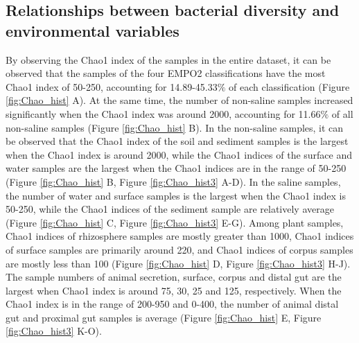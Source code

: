 \documentclass[11pt, a4paper]{article}
\begin{document}
\begin{spacing}{1.5}
\subsection{Relationships between bacterial diversity and environmental variables}

By observing the Chao1 index of the samples in the entire dataset, it can be observed that the samples of the four EMPO2 classifications have the most Chao1 index of 50-250, accounting for 14.89-45.33$\%$ of each classification (Figure \ref{fig:Chao_hist} A). At the same time, the number of non-saline samples increased significantly when the Chao1 index was around 2000, accounting for 11.66$\%$ of all non-saline samples (Figure \ref{fig:Chao_hist} B). In the non-saline samples, it can be observed that the Chao1 index of the soil and sediment samples is the largest when the Chao1 index is around 2000, while the Chao1 indices of the surface and water samples are the largest when the Chao1 indices are in the range of 50-250 (Figure \ref{fig:Chao_hist} B, Figure \ref{fig:Chao_hist3} A-D). In the saline samples, the number of water and surface samples is the largest when the Chao1 index is 50-250, while the Chao1 indices of the sediment sample are relatively average (Figure \ref{fig:Chao_hist} C, Figure \ref{fig:Chao_hist3} E-G). Among plant samples, Chao1 indices of rhizosphere samples are mostly greater than 1000, Chao1 indices of surface samples are primarily around 220, and Chao1 indices of corpus samples are mostly less than 100 (Figure \ref{fig:Chao_hist} D, Figure \ref{fig:Chao_hist3} H-J). The sample numbers of animal secretion, surface, corpus and distal gut are the largest when Chao1 index is around 75, 30, 25 and 125, respectively. When the Chao1 index is in the range of 200-950 and 0-400, the number of animal distal gut and proximal gut samples is average (Figure \ref{fig:Chao_hist} E, Figure \ref{fig:Chao_hist3} K-O).



\end{spacing}
\end{document}
